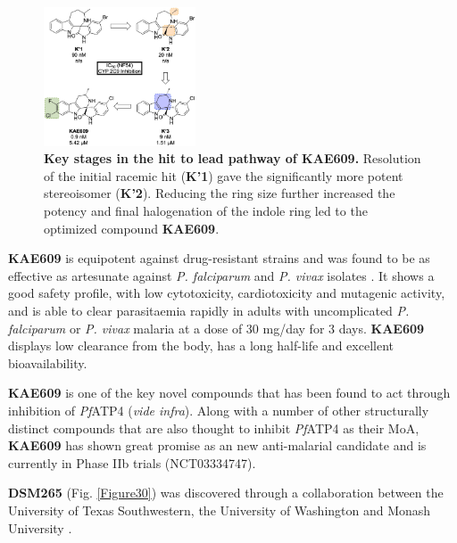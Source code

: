 \documentclass[twocolumn]{bmcart}%
\begin{document}
\begin{figure}[h]
	\includegraphics [width=0.4\textwidth] {Figure29}
	\caption{{\bf Key stages in the hit to lead pathway of KAE609.} Resolution of the initial racemic hit (\textbf{K'1}) gave the significantly more potent stereoisomer (\textbf{K'2}). Reducing the ring size further increased the potency and final halogenation of the indole ring led to the optimized compound \textbf{KAE609}.}
	\label{Figure29}
\end{figure}

\textbf{KAE609} is equipotent against drug-resistant strains and was found to be as effective as artesunate against \textit{P. falciparum} and \textit{P. vivax} isolates \cite{White2014}. It shows a good safety profile, with low cytotoxicity, cardiotoxicity and mutagenic activity, and is able to clear parasitaemia rapidly in adults with uncomplicated \textit{P. falciparum} or \textit{P. vivax} malaria at a dose of 30 mg/day for 3 days. \textbf{KAE609} displays low clearance from the body, has a long half-life and excellent bioavailability.

\textbf{KAE609} is one of the key novel compounds that has been found to act through inhibition of \textit{Pf}ATP4 (\textit{vide infra}). Along with a number of other structurally distinct compounds that are also thought to inhibit \textit{Pf}ATP4 as their MoA, \textbf{KAE609} has shown great promise as an new anti-malarial candidate and is currently in Phase IIb trials (NCT03334747).

\hrulefill

\textbf{DSM265} (Fig. \ref{Figure30}) was discovered through a collaboration between the University of Texas Southwestern, the University of Washington and Monash University \cite{Coteron2011}.
\end{document}

